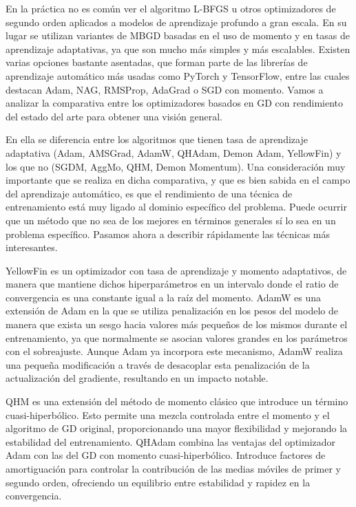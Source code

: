 En la práctica no es común ver el algoritmo L-BFGS u otros optimizadores de segundo orden aplicados a modelos de aprendizaje profundo a gran escala. En su lugar se utilizan variantes de MBGD basadas en el uso de momento y en tasas de aprendizaje adaptativas, ya que son mucho más simples y más escalables. Existen varias opciones bastante asentadas, que forman parte de las librerías de aprendizaje automático más usadas como PyTorch y TensorFlow, entre las cuales destacan Adam, NAG, RMSProp, AdaGrad o SGD con momento. Vamos a analizar la comparativa \cite{Kyrillidis2020} entre los optimizadores basados en GD con rendimiento del estado del arte para obtener una visión general.

En ella se diferencia entre los algoritmos que tienen tasa de aprendizaje adaptativa (Adam, AMSGrad, AdamW, QHAdam, Demon Adam, YellowFin) y los que no (SGDM, AggMo, QHM, Demon Momentum). Una consideración muy importante que se realiza en dicha comparativa, y que es bien sabida en el campo del aprendizaje automático, es que el rendimiento de una técnica de entrenamiento está muy ligado al dominio específico del problema. Puede ocurrir que un método que no sea de los mejores en términos generales sí lo sea en un problema específico. Pasamos ahora a describir rápidamente las técnicas más interesantes.


YellowFin \cite{yellowfin} es un optimizador con tasa de aprendizaje y momento adaptativos, de manera que mantiene dichos hiperparámetros en un intervalo donde el ratio de convergencia es una constante igual a la raíz del momento. AdamW es una extensión de Adam en la que se utiliza penalización en los pesos del modelo de manera que exista un sesgo hacia valores más pequeños de los mismos durante el entrenamiento, ya que normalmente se asocian valores grandes en los parámetros con el sobreajuste. Aunque Adam ya incorpora este mecanismo, AdamW realiza una pequeña modificación a través de desacoplar esta penalización de la actualización del gradiente, resultando en un impacto notable. 

QHM es una extensión del método de momento clásico que introduce un término cuasi-hiperbólico. Esto permite una mezcla controlada entre el momento y el algoritmo de GD original, proporcionando una mayor flexibilidad y mejorando la estabilidad del entrenamiento. QHAdam combina las ventajas del optimizador Adam con las del GD con momento cuasi-hiperbólico. Introduce factores de amortiguación para controlar la contribución de las medias móviles de primer y segundo orden, ofreciendo un equilibrio entre estabilidad y rapidez en la convergencia. 

